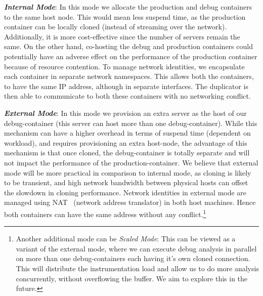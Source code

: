 \noindent
\textbf{\textit{Internal Mode}}: In this mode we allocate the production and debug containers to the same host node. 
This would mean less suspend time, as the production container can be locally cloned (instead of streaming over the network). 
Additionally, it is more cost-effective since the number of servers remain the same.
On the other hand, co-hosting the debug and production containers could potentially have an adverse effect on the performance of the production container because of resource contention.
To manage network identities, we encapsulate each container in separate network namespaces.
This allows both the containers, to have the same IP address, although in separate interfaces.
The duplicator is then able to communicate to both these containers with no networking conflict.

\noindent
\textbf{\textit{External Mode}}: In this mode we provision an extra server as the host of our debug-container (this server can host more than one debug-container). 
While this mechanism can have a higher overhead in terms of suspend time (dependent on workload), and requires provisioning an extra host-node, the advantage of this mechanism is that once cloned, the debug-container is totally separate and will not impact the performance of the production-container.
We believe that external mode will be more practical in comparison to internal mode, as cloning is likely to be transient, and high network bandwidth between physical hosts can offset the slowdown in cloning performance. 
Network identities in external mode are managed using NAT~\cite{nat} (network address translator) in both host machines. 
Hence both containers can have the same address without any conflict.\footnote{Another additional mode can be \textit{Scaled Mode}: This can be viewed as a variant of the external mode, where we can execute debug analysis in parallel on more than one debug-containers each having it's own cloned connection. This will distribute the instrumentation load and allow us to do more analysis concurrently, without overflowing the buffer. We aim to explore this in the future.}



